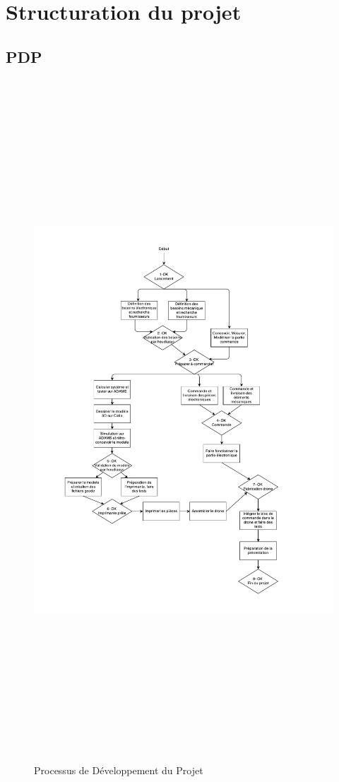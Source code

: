 \documentclass[a4paper, 12pt, leqno]{report}
\theoremstyle{plain}
\begin{document}
        \chapter{Structuration du projet}
        \begin{landscape}
        \section{PDP}
           \begin{figure}[H]
           \begin{center}
           \includegraphics[height=255mm, width=140mm, angle=90]{Files/PDPProject.pdf}
           \end{center}
           \caption{Processus de Développement du Projet}
           \label{Processus de Développement du Projet}
           \end{figure}


\end{landscape}
\end{document}
